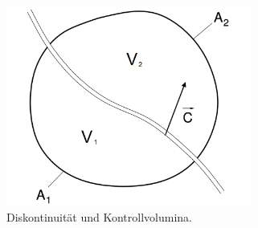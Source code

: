 \begin{figure}[H]
\centering
\includegraphics[trim=0cm 0cm 0cm 0cm,clip,  width=0.72\textwidth]{figures/Disk.png}
\caption{Diskontinuit\"at und Kontrollvolumina.}
\label{fig:Disk}
\end{figure}

